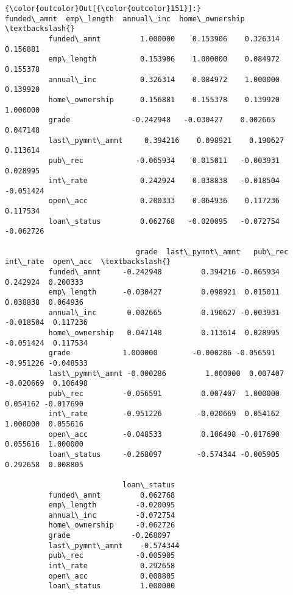 \documentclass[11pt]{article}
\begin{document}
\begin{Verbatim}[commandchars=\\\{\}]
{\color{outcolor}Out[{\color{outcolor}151}]:}                  funded\_amnt  emp\_length  annual\_inc  home\_ownership  \textbackslash{}
          funded\_amnt         1.000000    0.153906    0.326314        0.156881   
          emp\_length          0.153906    1.000000    0.084972        0.155378   
          annual\_inc          0.326314    0.084972    1.000000        0.139920   
          home\_ownership      0.156881    0.155378    0.139920        1.000000   
          grade              -0.242948   -0.030427    0.002665        0.047148   
          last\_pymnt\_amnt     0.394216    0.098921    0.190627        0.113614   
          pub\_rec            -0.065934    0.015011   -0.003931        0.028995   
          int\_rate            0.242924    0.038838   -0.018504       -0.051424   
          open\_acc            0.200333    0.064936    0.117236        0.117534   
          loan\_status         0.062768   -0.020095   -0.072754       -0.062726   
          
                              grade  last\_pymnt\_amnt   pub\_rec  int\_rate  open\_acc  \textbackslash{}
          funded\_amnt     -0.242948         0.394216 -0.065934  0.242924  0.200333   
          emp\_length      -0.030427         0.098921  0.015011  0.038838  0.064936   
          annual\_inc       0.002665         0.190627 -0.003931 -0.018504  0.117236   
          home\_ownership   0.047148         0.113614  0.028995 -0.051424  0.117534   
          grade            1.000000        -0.000286 -0.056591 -0.951226 -0.048533   
          last\_pymnt\_amnt -0.000286         1.000000  0.007407 -0.020669  0.106498   
          pub\_rec         -0.056591         0.007407  1.000000  0.054162 -0.017690   
          int\_rate        -0.951226        -0.020669  0.054162  1.000000  0.055616   
          open\_acc        -0.048533         0.106498 -0.017690  0.055616  1.000000   
          loan\_status     -0.268097        -0.574344 -0.005905  0.292658  0.008805   
          
                           loan\_status  
          funded\_amnt         0.062768  
          emp\_length         -0.020095  
          annual\_inc         -0.072754  
          home\_ownership     -0.062726  
          grade              -0.268097  
          last\_pymnt\_amnt    -0.574344  
          pub\_rec            -0.005905  
          int\_rate            0.292658  
          open\_acc            0.008805  
          loan\_status         1.000000  
\end{Verbatim}
            
\end{document}
